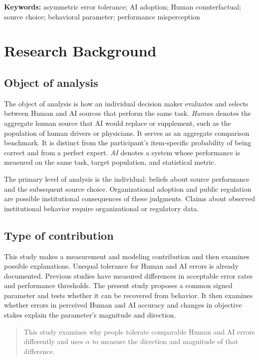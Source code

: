 \documentclass[11pt,a4paper]{article}
\newcommand{\Human}{\textit{Human}}
\newcommand{\AI}{\textit{AI}}
\begin{document}
\textbf{Keywords:} asymmetric error tolerance; AI adoption; Human counterfactual; source choice; behavioral parameter; performance misperception

\section{Research Background}

\subsection{Object of analysis}

The object of analysis is how an individual decision maker evaluates and selects between Human and AI sources that perform the same task. \Human{} denotes the aggregate human source that AI would replace or supplement, such as the population of human drivers or physicians. It serves as an aggregate comparison benchmark. It is distinct from the participant's item-specific probability of being correct and from a perfect expert. \AI{} denotes a system whose performance is measured on the same task, target population, and statistical metric.

The primary level of analysis is the individual: beliefs about source performance and the subsequent source choice. Organizational adoption and public regulation are possible institutional consequences of these judgments. Claims about observed institutional behavior require organizational or regulatory data.

\subsection{Type of contribution}

This study makes a measurement and modeling contribution and then examines possible explanations. Unequal tolerance for Human and AI errors is already documented. Previous studies have measured differences in acceptable error rates and performance thresholds. The present study proposes a common signed parameter and tests whether it can be recovered from behavior. It then examines whether errors in perceived Human and AI accuracy and changes in objective stakes explain the parameter's magnitude and direction.

\begin{quote}
This study examines why people tolerate comparable Human and AI errors differently and uses $\alpha$ to measure the direction and magnitude of that difference.
\end{quote}
\end{document}
